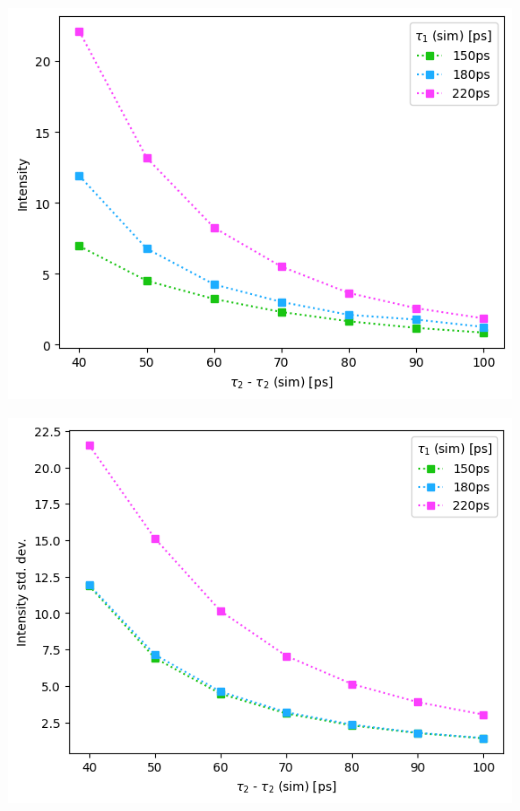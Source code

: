 \begin{minipage}{.5\linewidth}
    \centering
    \includegraphics[width=\linewidth]{Batch 3/regular IRF/5050-diff i1.png}
    \label{fig:comp-I-5050}
\end{minipage}
\begin{minipage}{.5\linewidth}
    \centering
    \includegraphics[width=\linewidth]{Batch 3/regular IRF/5050-err i1.png}
    \label{fig:comp-Ierr-5050}
\end{minipage}
